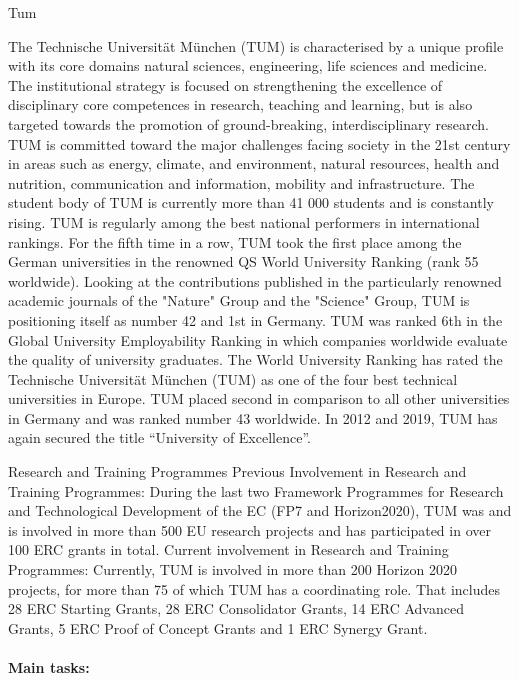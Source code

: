 \begin{sitedescription}{Tum}


The 
Technische Universität München
(TUM) is characterised by a unique profile with its core domains natural sciences, engineering, life sciences and medicine. The institutional strategy is focused on strengthening the excellence of disciplinary core competences in research, teaching and learning, but is also targeted towards the promotion of ground-breaking, interdisciplinary research. TUM is committed toward the major challenges facing society in the 21st century in areas such as energy, climate, and environment, natural resources, health and nutrition, communication and information, mobility and infrastructure.
The student body of TUM is currently more than 41 000 students and is constantly rising. TUM is regularly among the best national performers in international rankings. For the fifth time in a row, TUM took the first place among the German universities in the renowned QS World University Ranking (rank 55 worldwide). Looking at the contributions published in the particularly renowned academic journals of the "Nature" Group and the "Science" Group, TUM is positioning itself as number 42 and 1st in Germany. TUM was ranked 6th in the Global University Employability Ranking in which companies worldwide evaluate the quality of university graduates. The World University Ranking has rated the
Technische Universität München
(TUM) as one of the four best technical universities in Europe. TUM placed second in comparison to all other universities in Germany and was ranked number 43 worldwide. 
In 2012 and 2019, TUM has again secured the title ``University of Excellence''.

Research and Training Programmes
Previous Involvement in Research and Training Programmes:
During the last two Framework Programmes for Research and Technological Development of the EC (FP7 and Horizon2020), TUM was and is involved in more than 500 EU research projects and has participated in over 100 ERC grants in total.
Current involvement in Research and Training Programmes: 
Currently, TUM is involved in more than 200 Horizon 2020 projects, for more than 75 of which TUM has a coordinating role. That includes 28 ERC Starting Grants, 28 ERC Consolidator Grants, 14 ERC Advanced Grants, 5 ERC Proof of Concept Grants and 1 ERC Synergy Grant.

\paragraph*{Main tasks:}


\end{sitedescription}
